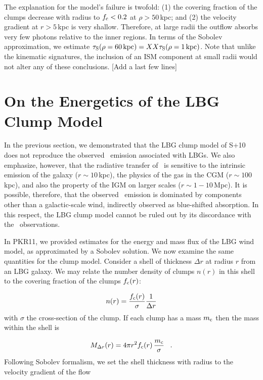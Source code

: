 \documentclass[12pt,preprint]{aastex}
\begin{document}
The explanation for the model's failure is twofold:  
(1) the covering fraction of the clumps decrease with radius to
$f_{\rm c} < 0.2$ at $\rho > 50$\,kpc; and
(2) the velocity gradient at $r>5$\,kpc is very shallow.  Therefore,
at large radii the outflow absorbs very few photons relative to the
inner regions.  In terms of the Sobolev approximation, we estimate
$\tau_{\rm S}(\rho = 60 \, {\rm kpc}) = XX \tau_{\rm S}(\rho=1\, {\rm
  kpc})$.  
Note that unlike the kinematic signatures, the inclusion of an ISM
component at small radii would not alter any of these conclusions.
[Add a last few lines]


\section{On the Energetics of the LBG Clump Model}
\label{sec:energy}

In the previous section, we demonstrated that the LBG clump model
of S+10 does not reproduce the observed \lya\ emission associated with
LBGs.   We also emphasize, however, that the radiative transfer of
\lya\ is sensitive to the intrinsic emission of the galaxy ($r \sim
10$\,kpc), the physics of the gas in the CGM ($r \sim 100$\,kpc), and
also the property of the IGM on larger scales ($r \sim 1-10$\,Mpc).
It is possible, therefore, that the observed \lya\ emission is
dominated by components other than a galactic-scale wind, indirectly
observed as blue-shifted absorption.  In this respect, the LBG clump
model cannot be ruled out by its discordance with the \lya\
observations.

In PKR11, we provided estimates for the energy and mass flux of the
LBG wind model, as approximated by a Sobolev solution.  We now
examine the same quantities for the clump model.  Consider a shell of
thickness $\Delta r$ at radius $r$ from an LBG galaxy.  We may relate
the number density of clumps $n(r)$ in this shell to the covering
fraction of the clumps $f_{\rm c}(r)$:

\begin{equation}
n(r) = \frac{f_{\rm c}(r)}{\sigma} \frac{1}{\Delta r}
\label{eqn:density}
\end{equation}
with $\sigma$ the cross-section of the clump.  If each clump has a
mass $m_{\rm c}$ then the mass within the shell is

\begin{equation}
M_{\Delta r}(r) = 4\pi r^2 f_{\rm c}(r) \, \frac{m_{\rm c}}{\sigma}
\;\;\; .
\label{eqn:mshell}
\end{equation}
Following Sobolev formalism, we set the shell thickness with radius to
the velocity gradient of the flow
\end{document}
